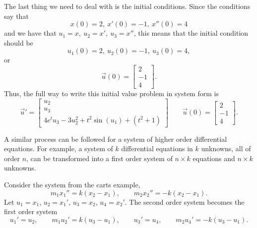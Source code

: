 \begin{exampleSol}
The last thing we need to deal with is the initial conditions. Since the conditions say that  
\begin{equation*}
x(0) = 2,\ x'(0) = -1,\ x''(0) = 4
\end{equation*}
and we have that $u_1 = x,\ u_2 = x',\ u_3 = x''$, this means that the initial condition should be 
\begin{equation*}
u_1(0) = 2,\ u_2(0) = -1,\ u_3(0) = 4,
\end{equation*}
or
\begin{equation*}
\vec{u}(0) = \begin{bmatrix} 2 \\ -1 \\ 4 \end{bmatrix}.
\end{equation*}
Thus, the full way to write this initial value problem in system form is
\begin{equation*}
\vec{u}' = \begin{bmatrix} u_2 \\ u_3 \\  4e^tu_3 - 3u_2^2 + t^2\sin(u_1) + (t^2 + 1) \end{bmatrix} \qquad \vec{u}(0) = \begin{bmatrix} 2 \\ -1 \\ 4 \end{bmatrix}.
\end{equation*}
\end{exampleSol}

A similar process can be followed for a system of higher order differential
equations.  For example, a system of $k$ differential equations in $k$
unknowns, all of order $n$, can be transformed into a first
order system of $n \times k$
equations and $n \times k$ unknowns.

\begin{example}
Consider the system from the carts example,
\begin{equation*}
m_1 x_1''  = k(x_2-x_1), \qquad m_2 x_2'' = - k(x_2-x_1) .
\end{equation*}
Let $u_1 = x_1$, $u_2 = x_1'$, 
$u_3 = x_2$, $u_4 = x_2'$.  The second order system becomes the
first order system
\begin{equation*}
u_1' = u_2, \qquad
m_1 u_2'  = k(u_3-u_1), \qquad
u_3' = u_4, \qquad
m_2 u_4' = - k(u_3-u_1) .
\end{equation*}
\end{example}

